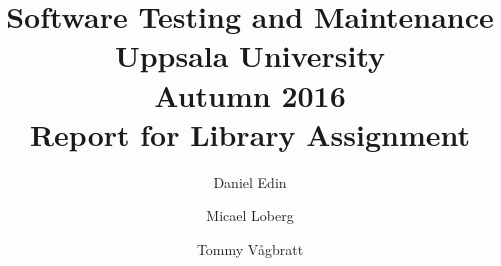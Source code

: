 
\title{\textbf{Software Testing and Maintenance\\
    Uppsala University \\ Autumn 2016 \\
    Report for Library Assignment}}


\author{ Daniel Edin \and Micael Loberg \and Tommy Vågbratt }

\date{}
